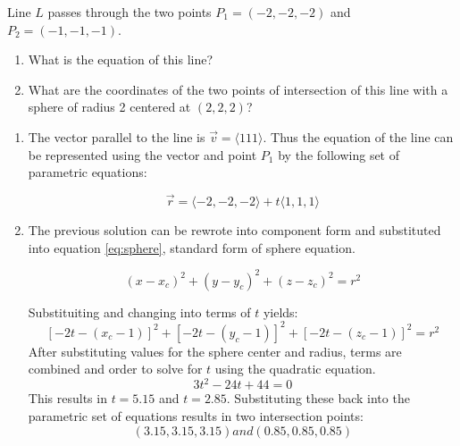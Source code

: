 Line $L$ passes through the two points $P_1=\left(-2,-2,-2\right)$ and $P_2=\left(-1,-1,-1\right)$.
\begin{enumerate}[label=\alph*)]
	\item What is the equation of this line?

	\item What are the coordinates of the two points of intersection of this line with a sphere of radius 2 centered at $\left( 2,2,2\right)$?
\end{enumerate}

\begin{enumerate}[label=\alph*)]
	\item The vector parallel to the line is $\vec{v}=\langle 1 1 1 \rangle$. Thus the equation of the line can be represented using the vector and point $P_1$ by the following set of parametric equations:
	
	\begin{equation*}
	\boxed{
		\vec{r}=\langle -2, -2,-2\rangle +t\langle 1, 1, 1 \rangle}
	\end{equation*}

	\item The previous solution can be rewrote into component form and substituted into equation \ref{eq:sphere}, standard form of sphere equation.
	
	\begin{equation}
		\left(x-x_c\right)^2+\left(y-y_c\right)^2+\left(z-z_c\right)^2=r^2
		\label{eq:sphere}
	\end{equation}

	Substituiting and changing into terms of $t$ yields:
	\begin{equation*}
		\left[-2t-\left(x_c-1\right)\right]^2+\left[-2t-\left(y_c-1\right)\right]^2+\left[-2t-\left(z_c-1\right)\right]^2=r^2
	\end{equation*}
	After substituting values for the sphere center and radius, terms are combined and order to solve for $t$ using the quadratic equation. 
	\begin{equation*}
		3t^2-24t+44=0
	\end{equation*}
	This results in $t= 5.15$ and $t=2.85$. Substituting these back into the parametric set of equations results in two intersection points:
\begin{equation*}\boxed{
 \left(3.15, 3.15, 3.15\right) and \left(0.85, 0.85, 0.85\right)}
\end{equation*}
\end{enumerate}
